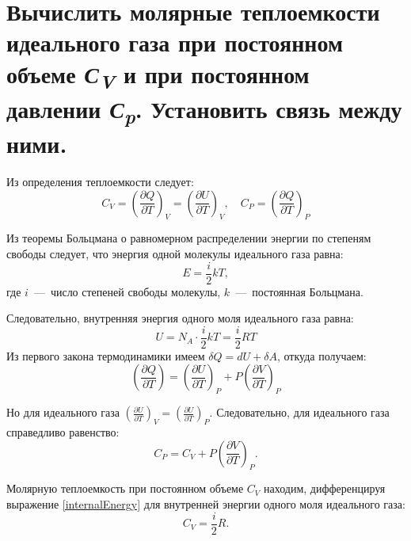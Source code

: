 \section{Вычислить молярные теплоемкости идеального газа при
постоянном объеме \emph{С\textsubscript{V}} и при постоянном давлении
\emph{С\textsubscript{p}}. Установить связь между ними.} \label{task3-3}

\solving{}

Из определения теплоемкости следует:
\begin{equation}
  C_V = \left ( \frac{\partial Q}{\partial T} \right )_V = \left ( \frac{\partial U}{\partial T} \right )_V, \quad C_P = \left ( \frac{\partial Q}{\partial T} \right )_P
\end{equation}

Из теоремы Больцмана о равномерном распределении энергии по степеням свободы следует, что энергия одной молекулы идеального газа равна:
\begin{equation}
  E = \frac{i}{2}kT,
\end{equation}
где $i$~---~число степеней свободы молекулы, $k$~---~постоянная Больцмана.

Следовательно, внутренняя энергия одного моля идеального газа равна:
\begin{equation} \label{internalEnergy}
  U = N_A \cdot \frac{i}{2} kT = \frac{i}{2}RT
\end{equation}
Из первого закона термодинамики имеем $\delta Q = dU + \delta A$, откуда получаем: 
\begin{equation}
  \left ( \frac{\partial Q}{\partial T} \right ) = \left ( \frac{\partial U}{\partial T} \right )_P + P \left ( \frac{\partial V}{\partial T} \right )_P
\end{equation}

Но для идеального газа $\left ( \frac{\partial U}{\partial T} \right )_V = \left ( \frac{\partial U}{\partial T} \right )_P$.
Следовательно, для идеального газа справедливо равенство:
\begin{equation} \label{isochorAndIsobar}
  C_P = C_V + P \left ( \frac{\partial V}{\partial T}\right )_P.
\end{equation}

Молярную теплоемкость при постоянном объеме $C_V$ находим, дифференцируя выражение \ref{internalEnergy} для внутренней энергии одного моля идеального газа:
\begin{equation}
  C_V = \frac{i}{2}R.
\end{equation}

